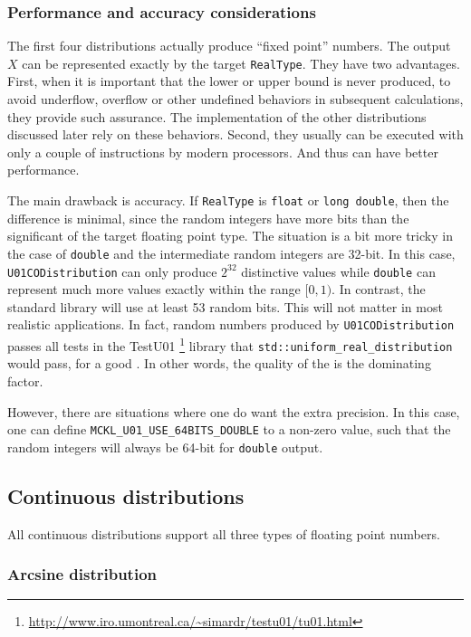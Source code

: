 \subsubsection{Performance and accuracy considerations}

The first four distributions actually produce ``fixed point'' numbers. The
output $X$ can be represented exactly by the target \verb|RealType|. They have
two advantages. First, when it is important that the lower or upper bound is
never produced, to avoid underflow, overflow or other undefined behaviors in
subsequent calculations, they provide such assurance. The implementation of the
other distributions discussed later rely on these behaviors. Second, they
usually can be executed with only a couple of instructions by modern
processors. And thus can have better performance.

The main drawback is accuracy. If \verb|RealType| is \verb|float| or
\verb|long double|, then the difference is minimal, since the random integers
have more bits than the significant of the target floating point type. The
situation is a bit more tricky in the case of \verb|double| and the
intermediate random integers are 32-bit. In this case, \verb|U01CODistribution|
can only produce $2^{32}$ distinctive values while \verb|double| can represent
much more values exactly within the range $[0, 1)$. In contrast, the standard
library will use at least 53 random bits. This will not matter in most
realistic applications. In fact, random numbers produced by
\verb|U01CODistribution| passes all tests in the {\lnfigures\tbfigures
  TestU01}%
\footnote{\url{http://www.iro.umontreal.ca/~simardr/testu01/tu01.html}} library
that \verb|std::uniform_real_distribution| would pass, for a good \rng. In
other words, the quality of the \rng is the dominating factor.

However, there are situations where one do want the extra precision. In this
case, one can define \verb|MCKL_U01_USE_64BITS_DOUBLE| to a non-zero value,
such that the random integers will always be 64-bit for \verb|double| output.

\subsection{Continuous distributions}
\label{sub:Continuous distributions}

All continuous distributions support all three types of floating point numbers.

\subsubsection{Arcsine distribution}

